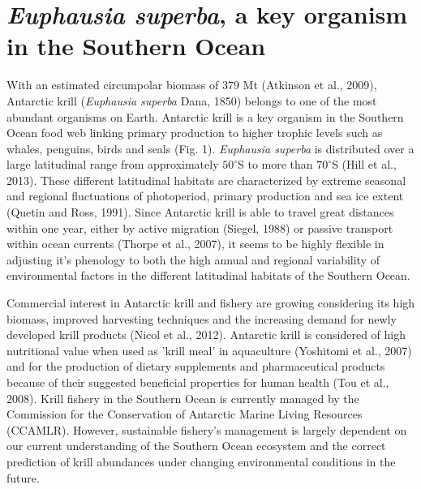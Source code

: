 \section{\textit{Euphausia superba}, a key organism in the Southern Ocean}
With an estimated circumpolar biomass of 379 Mt (Atkinson et al., 2009), Antarctic krill (\textit{Euphausia superba} Dana, 1850) belongs to one of the most abundant organisms on Earth. Antarctic krill is a key organism in the Southern Ocean food web linking primary production to higher trophic levels such as whales, penguins, birds and seals (Fig. 1). \textit{Euphausia superba} is distributed over a large latitudinal range from approximately $50^{\circ}$S to more than $70^{\circ}$S (Hill et al., 2013). These different latitudinal habitats are characterized by extreme seasonal and regional fluctuations of photoperiod, primary production and sea ice extent (Quetin and Ross, 1991). Since Antarctic krill is able to travel great distances within one year, either by active migration (Siegel, 1988) or passive transport within ocean currents (Thorpe et al., 2007), it seems to be highly flexible in adjusting it's phenology to both the high annual and regional variability of environmental factors in the different latitudinal habitats of the Southern Ocean. 

Commercial interest in Antarctic krill and fishery are growing considering its high biomass, improved harvesting techniques and the increasing demand for newly developed krill products (Nicol et al., 2012). Antarctic krill is considered of high nutritional value when used as 'krill meal' in aquaculture (Yoshitomi et al., 2007) and for the production of dietary supplements and pharmaceutical products because of their suggested beneficial properties for human health (Tou et al., 2008). Krill fishery in the Southern Ocean is currently managed by the Commission for the Conservation of Antarctic Marine Living Resources (CCAMLR). However, sustainable fishery's management is largely dependent on our current understanding of the Southern Ocean ecosystem and the correct prediction of krill abundances under changing environmental conditions in the future. 

